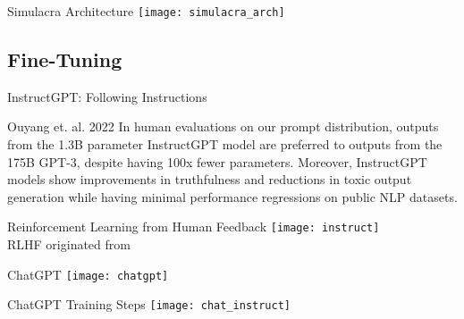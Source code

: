 \begin{frame}[c]{Simulacra Architecture}
    \texttt{[image: simulacra\_arch]} \\
\end{frame}

\subsection{Fine-Tuning}
\begin{frame}[c]{InstructGPT: Following Instructions}
    \begin{aquote}{Ouyang et. al. 2022 \cite{ouyang_training_2022}}
        In human evaluations on our prompt distribution, outputs from the 1.3B
        parameter InstructGPT model are preferred to outputs from the 175B
        GPT-3, despite having 100x fewer parameters. Moreover, InstructGPT
        models show improvements in truthfulness and reductions in toxic output
        generation while having minimal performance regressions on public NLP
        datasets.
    \end{aquote}
\end{frame}

\begin{frame}[c]{Reinforcement Learning from Human Feedback}
    \texttt{[image: instruct]}\\
     \large \hspace{2em} RLHF originated from \cite{christiano_deep_2017}
\end{frame}

\begin{frame}[c]{ChatGPT}
    \texttt{[image: chatgpt]} \\
\end{frame}

\begin{frame}[c]{ChatGPT Training Steps}
    \texttt{[image: chat\_instruct]} \\
\end{frame}


